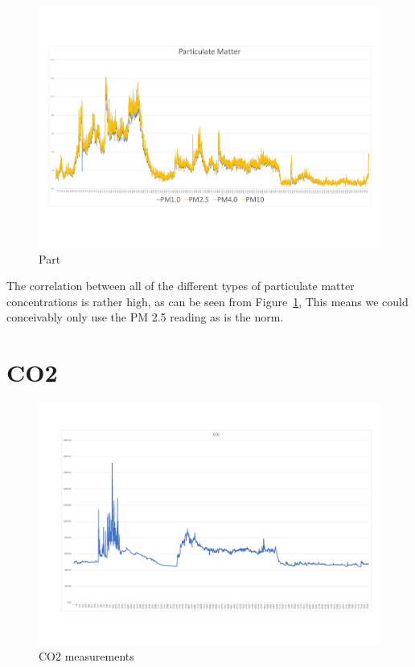\begin{figure}[!htb]
	\centering
	\includegraphics[width=0.7\linewidth]{body/fig/PMall.pdf}
	\caption{Part}
	\label{fig:PMall}
\end{figure}

\noindent
The correlation between all of the different types of particulate matter concentrations is rather high, as can be seen from Figure~\ref{fig:PMall}, This means we could conceivably only use the PM 2.5 reading as is the norm.




\section{CO2}
\begin{figure}[!htb]
	\centering
	\includegraphics[width=0.7\linewidth]{body/fig/CO2}
	\caption{CO2 measurements}
	\label{fig:co2}
\end{figure}
